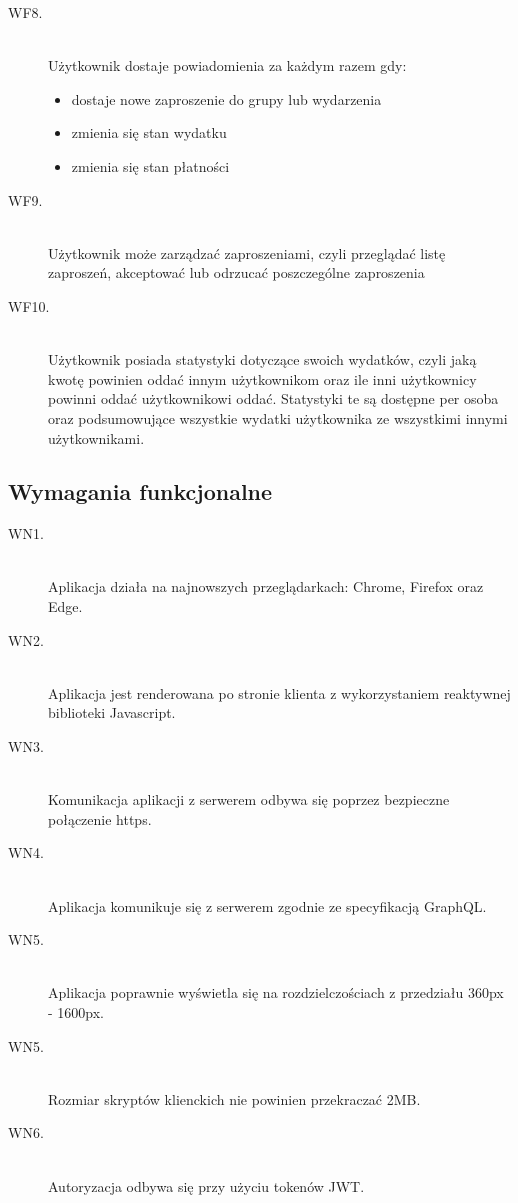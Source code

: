 \begin{description}
  \item[WF8.] \hfill \\ Użytkownik dostaje powiadomienia za każdym razem gdy:
    \begin{itemize}
      \item dostaje nowe zaproszenie do grupy lub wydarzenia
      \item zmienia się stan wydatku
      \item zmienia się stan płatności
    \end{itemize}
  \item[WF9.] \hfill \\ Użytkownik może zarządzać zaproszeniami, czyli przeglądać listę zaproszeń, akceptować lub odrzucać poszczególne zaproszenia
  \item[WF10.] \hfill \\ Użytkownik posiada statystyki dotyczące swoich wydatków, czyli jaką kwotę powinien oddać innym użytkownikom oraz ile inni użytkownicy powinni oddać użytkownikowi oddać. Statystyki te są dostępne per osoba oraz podsumowujące wszystkie wydatki użytkownika ze wszystkimi innymi użytkownikami.
\end{description}

\subsection{Wymagania funkcjonalne}
\begin{description}
  \item[WN1.] \hfill \\ Aplikacja działa na najnowszych przeglądarkach: Chrome, Firefox oraz Edge.
  \item[WN2.] \hfill \\ Aplikacja jest renderowana po stronie klienta z wykorzystaniem reaktywnej biblioteki Javascript.
  \item[WN3.] \hfill \\ Komunikacja aplikacji z serwerem odbywa się poprzez bezpieczne połączenie https.
  \item[WN4.] \hfill \\ Aplikacja komunikuje się z serwerem zgodnie ze specyfikacją GraphQL.
  \item[WN5.] \hfill \\ Aplikacja poprawnie wyświetla się na rozdzielczościach z przedziału 360px - 1600px.
  \item[WN5.] \hfill \\ Rozmiar skryptów klienckich nie powinien przekraczać 2MB.
  \item[WN6.] \hfill \\ Autoryzacja odbywa się przy użyciu tokenów JWT.
\end{description}
